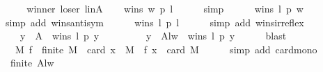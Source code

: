 \begin{isabellebody}
%
\isadelimproof
%
\endisadelimproof
%
\isatagproof
{}\isamarkupfalse%
\ {\isacharminus}{\kern0pt}\isanewline
\ \ \isamarkupfalse%
\ winner\ loser\ l{\isacharunderscore}{\kern0pt}in{\isacharunderscore}{\kern0pt}A\isanewline
\ \ \isamarkupfalse%
\ {\isachardoublequoteopen}wins\ w\ p\ l{\isachardoublequoteclose}\isanewline
\ \ \ \ \isamarkupfalse%
\ simp\isanewline
\ \ \isamarkupfalse%
\ {}{\isacharcolon}{\kern0pt}\ {\isachardoublequoteopen}{\isasymnot}\ wins\ l\ p\ w{\isachardoublequoteclose}\isanewline
\ \ \ \ \isamarkupfalse%
\ {\isacharparenleft}{\kern0pt}simp\ add{\isacharcolon}{\kern0pt}\ wins{\isacharunderscore}{\kern0pt}antisym{\isacharparenright}{\kern0pt}\isanewline
\ \ \isamarkupfalse%
\ {}{\isacharcolon}{\kern0pt}\ {\isachardoublequoteopen}{\isasymnot}\ wins\ l\ p\ l{\isachardoublequoteclose}\isanewline
\ \ \ \ \isamarkupfalse%
\ {\isacharparenleft}{\kern0pt}simp\ add{\isacharcolon}{\kern0pt}\ wins{\isacharunderscore}{\kern0pt}irreflex{\isacharparenright}{\kern0pt}\isanewline
\ \ \isamarkupfalse%
\ {}\ {}\ \isamarkupfalse%
\ {}{\isacharcolon}{\kern0pt}\isanewline
\ \ \ \ {\isachardoublequoteopen}{\isacharbraceleft}{\kern0pt}y\ {\isasymin}\ A\ {\isachardot}{\kern0pt}\ wins\ l\ p\ y{\isacharbraceright}{\kern0pt}\ {\isacharequal}{\kern0pt}\isanewline
\ \ \ \ \ \ \ \ {\isacharbraceleft}{\kern0pt}y\ {\isasymin}\ A{\isacharminus}{\kern0pt}{\isacharbraceleft}{\kern0pt}l{\isacharcomma}{\kern0pt}w{\isacharbraceright}{\kern0pt}\ {\isachardot}{\kern0pt}\ wins\ l\ p\ y{\isacharbraceright}{\kern0pt}{\isachardoublequoteclose}\isanewline
\ \ \ \ \isamarkupfalse%
\ blast\isanewline
\ \ \isamarkupfalse%
\ {}{\isacharcolon}{\kern0pt}\ {\isachardoublequoteopen}{\isasymforall}\ M\ f\ {\isachardot}{\kern0pt}\ finite\ M\ {\isasymlongrightarrow}\ card\ {\isacharbraceleft}{\kern0pt}x\ {\isasymin}\ M\ {\isachardot}{\kern0pt}\ f\ x{\isacharbraceright}{\kern0pt}\ {\isasymle}\ card\ M{\isachardoublequoteclose}\isanewline
\ \ \ \ \isamarkupfalse%
\ {\isacharparenleft}{\kern0pt}simp\ add{\isacharcolon}{\kern0pt}\ card{\isacharunderscore}{\kern0pt}mono{\isacharparenright}{\kern0pt}\isanewline
\ \ \isamarkupfalse%
\ {}{\isacharcolon}{\kern0pt}\ {\isachardoublequoteopen}finite\ {\isacharparenleft}{\kern0pt}A{\isacharminus}{\kern0pt}{\isacharbraceleft}{\kern0pt}l{\isacharcomma}{\kern0pt}w{\isacharbraceright}{\kern0pt}{\isacharparenright}{\kern0pt}{\isachardoublequoteclose}\isanewline

\end{isabellebody}
